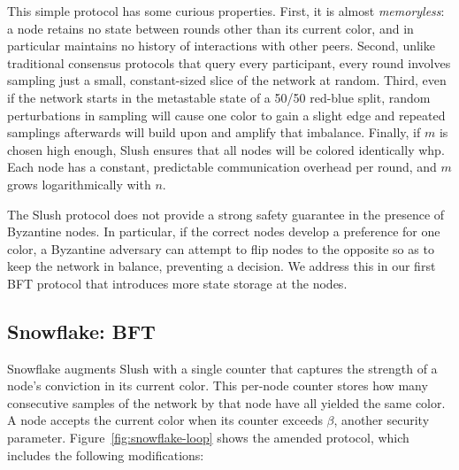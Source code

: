 \documentclass[letterpaper,twocolumn,10pt]{article}
\newcommand{\tronly}[2]{#1}
\theoremstyle{definition}
\begin{document}
This simple protocol has some curious properties.
First, it is almost \emph{memoryless}: a node retains no state between rounds other than its current color, and in particular maintains no history of interactions with other peers.
Second, unlike traditional consensus protocols that query every participant, every round involves sampling just a small, constant-sized slice of the network at random.
\tronly{Third, even if the network starts in the metastable state of a 50/50 red-blue split, random perturbations in sampling will cause one color to gain a slight edge and repeated samplings afterwards will build upon and amplify that imbalance.}{}
Finally, if $m$ is chosen high enough, Slush ensures that all nodes will be colored identically whp.
Each node has a constant, predictable communication overhead per round, and $m$ grows logarithmically with $n$. %

\tronly{
The Slush protocol does not provide a strong safety guarantee in the presence of Byzantine nodes.
In particular, if the correct nodes develop a preference for one color, a Byzantine adversary can attempt to flip nodes
to the opposite so as to keep the network in balance, preventing a decision.
We address this in our first BFT protocol that introduces more state storage at the nodes.
}{
We next examine how to extend Slush to tolerate Byzantine behavior.
}

\subsection{Snowflake: BFT}\tronly{}{\vspace{-0.5em}}

Snowflake augments Slush with a single counter that captures the strength of a node's conviction in its current color.
This per-node counter stores how many consecutive samples of the network by that node have all yielded the same color.
A node accepts the current color when its counter exceeds $\beta$, another security parameter.
Figure~\ref{fig:snowflake-loop} shows the amended protocol, which includes
the following modifications:
\end{document}
